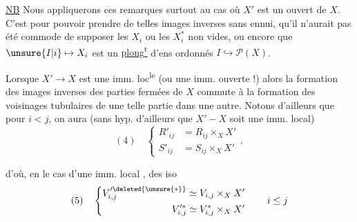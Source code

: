 \uline{NB} Nous appliquerons ces remarques surtout au
cas où $X'$ est un ouvert de $X$. C'est pour
pouvoir prendre de telles images inverses sans
ennui, qu'il n'aurait pas été commode
de supposer les $X_i$ ou les $X_i^*$ non vides,
ou encore que $\unsure{I|i}\mapsto X_i$ est un \uline{plong\textsuperscript{t}}
d'ens ordonnés $I\hookrightarrow\mathcal P(X)$.

Lorsque $X'\to X$ est une imm. loc\textsuperscript{le}  
  (ou une imm. ouverte !) alors
la formation des images inverses des
parties  fermées de $X$ commute à la
formation des voisinages tubulaires de
une telle partie dans une autre. Notons
d'ailleurs que pour $i<j$, on aura
(sans hyp. d'ailleurs que $X'-X$ soit une
imm. local)
\[
(4)\quad\left\{\begin{aligned}
R'_{ij}&=R_{ij}\times_X X'\\
S'_{ij}&=S_{ij}\times_X X'
\end{aligned}\right.,
\]

d'où, en le cas d'une imm. local ,
des iso
\[
(5)\quad\left\{\begin{aligned}
V'^{\deleted{\unsure{*}}}_{i,j}&\simeq V_{i,j}\times_X X'\\
V'^{*}_{i,j}&\simeq V^*_{i,j}\times_X X'
\end{aligned}\right.\qquad i\leq j
\]

